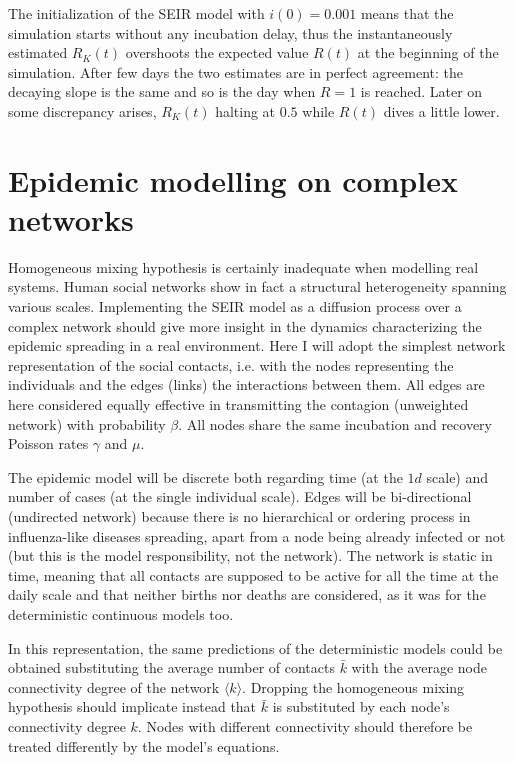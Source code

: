 \documentclass[DIV=12, BCOR=0pt]{scrartcl}  %
\begin{document}
	The initialization of the SEIR model with $i(0) = 0.001$ means that the simulation starts without any incubation delay, thus the instantaneously estimated $R_K(t)$ overshoots the expected value $R(t)$ at the beginning of the simulation. After few days the two estimates are in perfect agreement: the decaying slope is the same and so is the day when $R = 1$ is reached. Later on some discrepancy arises, $R_K(t)$ halting at $0.5$ while $R(t)$ dives a little lower.
 
  

  
  \section{Epidemic modelling on complex networks}
  \label{sec:network}
  Homogeneous mixing hypothesis is certainly inadequate when modelling real systems. Human social networks show in fact a structural heterogeneity spanning various scales. Implementing the SEIR model as a diffusion process over a complex network should give more insight in the dynamics characterizing the epidemic spreading in a real environment. Here I will adopt the simplest network representation of the social contacts, i.e. with the nodes representing the individuals and the edges (links) the interactions between them. All edges are here considered equally effective in transmitting the contagion (unweighted network) with probability $\beta$. All nodes share the same incubation and recovery Poisson rates $\gamma$ and $\mu$. 
  
  The epidemic model will be discrete both regarding time (at the $1 d$ scale) and number of cases (at the single individual scale). Edges will be bi-directional (undirected network) because there is no hierarchical or ordering process in influenza-like diseases spreading, apart from a node being already infected or not (but this is the model responsibility, not the network). The network is static in time, meaning that all contacts are supposed to be active for all the time at the daily scale and that neither births nor deaths are considered, as it was for the deterministic continuous models too. 

  In this representation, the same predictions of the deterministic models could be obtained substituting the average number of contacts $\bar{k}$ with the average node connectivity degree of the network $\langle k \rangle $. Dropping the homogeneous mixing hypothesis should implicate instead that $\bar{k}$ is substituted by each node's connectivity degree $k$. Nodes with different connectivity should therefore be treated differently by the model's equations. 
  
\end{document}
